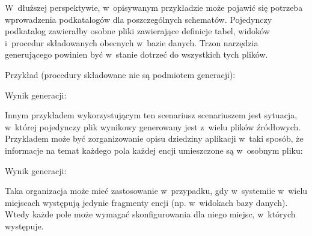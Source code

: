 W~dłuższej perspektywie, w~opisywanym przykładzie może pojawić się potrzeba wprowadzenia podkatalogów dla poszczególnych schematów.
Pojedynczy podkatalog zawierałby osobne pliki zawierające definicje tabel, widoków i~procedur składowanych obecnych w~bazie danych.
Trzon narzędzia generującego powinien być w~stanie dotrzeć do wszystkich tych plików.

Przykład (procedury składowane nie są podmiotem generacji):


Wynik generacji:


Innym przykładem wykorzystującym ten scenariusz scenariuszem jest sytuacja, w~której pojedynczy plik wynikowy generowany jest z~wielu plików źródłowych.
Przykladem może być zorganizowanie opisu dziedziny aplikacji w~taki sposób, że informacje na temat każdego pola każdej encji umieszczone są w~osobnym pliku:


Wynik generacji:


Taka organizacja może mieć zastosowanie w~przypadku, gdy w~systemiie w~wielu miejscach występują jedynie fragmenty encji (np. w~widokach bazy danych).
Wtedy każde pole może wymagać skonfigurowania dla niego miejsc, w~których występuje.
